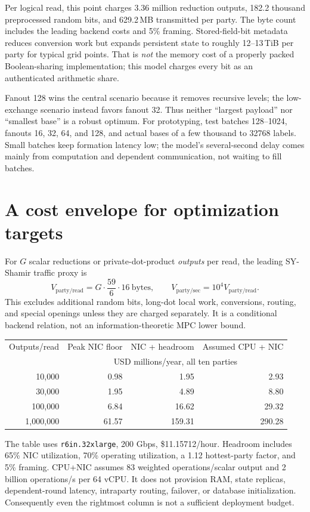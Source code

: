 \documentclass[11pt]{article}
\begin{document}
Per logical read, this point charges 3.36 million reduction outputs,
182.2 thousand preprocessed random bits, and 629.2\,MB transmitted per party.
The byte count includes the leading backend costs and 5\% framing. Stored-field-bit
metadata reduces conversion work but expands persistent state to roughly 12--13\,TiB
per party for typical grid points. That is \emph{not} the memory cost of a properly
packed Boolean-sharing implementation; this model charges every bit as an
authenticated arithmetic share.

Fanout 128 wins the central scenario because it removes recursive levels; the
low-exchange scenario instead favors fanout 32. Thus neither ``largest payload''
nor ``smallest base'' is a robust optimum. For prototyping, test batches 128--1024,
fanouts 16, 32, 64, and 128, and actual bases of a few thousand to 32768 labels. Small batches
keep formation latency low; the model's several-second delay comes mainly from
computation and dependent communication, not waiting to fill batches.

\section{A cost envelope for optimization targets}
For $G$ scalar reductions or private-dot-product \emph{outputs} per read, the
leading SY-Shamir traffic proxy is
\[
 V_{\mathrm{party/read}}=G\cdot\frac{59}{6}\cdot16\ \text{bytes},\qquad
 V_{\mathrm{party/sec}}=10^4 V_{\mathrm{party/read}}.
\]
This excludes additional random bits, long-dot local work, conversions, routing,
and special openings unless they are charged separately. It is a conditional
backend relation, not an information-theoretic MPC lower bound.

\begin{center}\small\begin{tabular}{rrrr}\toprule
Outputs/read & Peak NIC floor & NIC + headroom & Assumed CPU + NIC\\
&\multicolumn{3}{c}{USD millions/year, all ten parties}\\\midrule
10,000 & 0.98 & 1.95 & 2.93 \\
30,000 & 1.95 & 4.89 & 8.80 \\
100,000 & 6.84 & 16.62 & 29.32 \\
1,000,000 & 61.57 & 159.31 & 290.28 \\
\bottomrule\end{tabular}\end{center}
The table uses \texttt{r6in.32xlarge}, 200 Gbps, \$11.15712/hour. Headroom includes
65\% NIC utilization, 70\% operating utilization, a 1.12 hottest-party factor, and
5\% framing. CPU+NIC assumes 83 weighted operations/scalar output and 2 billion
operations/s per 64 vCPU. It does not provision RAM, state replicas, dependent-round
latency, intraparty routing, failover, or database initialization. Consequently
even the rightmost column is not a sufficient deployment budget.
\end{document}

